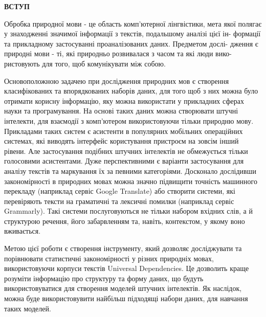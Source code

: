 \thispagestyle{empty}

\begin{center}
\textbf{\Large ВСТУП}
\end{center}

Обробка природної мови - це область комп’ютерної лінгвістики, мета якої
полягає у знаходженні значимої інформації з текстів, подальшому аналізі цієї ін-
формації та прикладному застосуванні проаналізованих даних. Предметом дослі-
дження є природні мови - ті, які природньо розвивалася з часом та які люди вико-
ристовують для того, щоб комунікувати між собою.

Основоположною задачею при дослідження природних мов є створення класифікованих
та впорядкованих наборів даних, для того щоб з них можна було отримати
корисну інформацію, яку можна використати у прикладних сферах науки та програмування.
На основі таких даних можна створювати штучні інтелекти, для взаємодії з комп'ютером
використовуючи тільки природню мову. Прикладами таких систем є асистенти в популярних
мобільних операційних системах, які виводять інтерфейс користування пристроєм
на зовсім інший рівени. Але застосування подібних штучних інтелектів
не обмежується тільки голосовими асистентами. Дуже перспективними є варіанти застосування
для аналізу текстів та маркування їх за певними категоріями. Досконало дослідивши
закономірності в природних мовах можна значно підвищити точність машинного перекладу
(наприклад сервіс Google Translate) або створити системи, які перевіряють
тексти на граматичні та лексичні помилки (наприклад сервіс Grammarly). Такі системи
послуговуються не тільки набором вхідних слів, а й структурою речення,
його забарвленням та, навіть, контекстом, у якому воно вживається.

Метою цієї роботи є створення інструменту, який дозволяє досліджувати та порівнювати
статистичні закономірності у різних природніх мовах,
використовуючи корпуси текстів Universal Dependencies. Це дозволить краще розуміти
інформацію про структуру та форму даних, що будуть використовуватися для
створення моделей штучних інтелектів. Як наслідок, можна буде використовувити
найбільш підходящі набори даних, для навчання таких моделей.